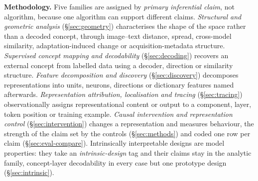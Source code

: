 \textbf{Methodology.} Five families are assigned by \emph{primary inferential claim}, not algorithm,
because one algorithm can support different claims. \emph{Structural and geometric analysis}
(\S\ref{sec:geometry}) characterises the shape of the space rather than a decoded concept, through
image--text distance, spread, cross-model similarity, adaptation-induced change or acquisition-metadata
structure. \emph{Supervised concept mapping and decodability}
(\S\ref{sec:decoding}) recovers an external concept from labelled data using a decoder, direction or
similarity structure. \emph{Feature decomposition and discovery} (\S\ref{sec:discovery}) decomposes
representations into units, neurons, directions or dictionary features named afterwards.
\emph{Representation attribution, localisation and tracing} (\S\ref{sec:tracing}) observationally
assigns representational content or output to a component, layer, token position or training example.
\emph{Causal intervention and representation control} (\S\ref{sec:intervention}) changes a
representation and measures behaviour, the strength of the claim set by the controls
(\S\ref{sec:methods}) and coded one row per claim (\S\ref{sec:eval-compare}). Intrinsically interpretable
designs are model properties: they take an \emph{intrinsic-design} tag and their claims stay in the
analytic family, concept-layer decodability in every case but one prototype design
(\S\ref{sec:intrinsic}).


